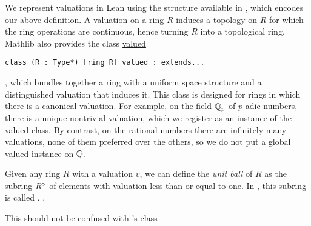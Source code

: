\documentclass[sigplan,10pt,anonymous,review]{acmart}
\begin{document}
We represent valuations in Lean using the  structure \href{https://leanprover-community.github.io/mathlib_docs/ring_theory/valuation/basic.html#valuation}{\extlink}
 available in \mathlib, which encodes our above definition. A valuation on a ring $R$ induces a topology on $R$ for which the ring operations are continuous, hence turning $R$ into a topological ring.
Mathlib also provides the class \href{https://leanprover-community.github.io/mathlib_docs/topology/algebra/valuation.html#valued}{valued}
\begin{lstlisting}
class (R : Type*) [ring R] valued : extends...
\end{lstlisting}
, which bundles together a ring with a
uniform space structure and a distinguished valuation that induces it. This class is designed for rings in which there is a canonical valuation. For example, on the field $\mathbb{Q}_p$ of $p$-adic numbers, there is a unique nontrivial valuation, which we register as an instance of the valued class. By contrast, on the rational numbers there are infinitely many valuations, none of them preferred over the others, so we do not put a global valued instance on $\mathbb{Q}$.

Given any ring $R$ with a valuation $v$, we can define the \textit{unit ball} of $R$ as the subring ${R}^\circ$ of elements with valuation less than or equal to one. In \mathlib, this subring is called  \href{https://leanprover-community.github.io/mathlib_docs/ring_theory/valuation/integers.html#valuation.integer}{\extlink}.  \href{https://leanprover-community.github.io/mathlib_docs/ring_theory/valuation/valuation_subring.html#valuation_subring}{\extlink}.


 This should not be confused with \mathlib's  \href{https://leanprover-community.github.io/mathlib_docs/ring_theory/valuation/valuation_ring.html#valuation_ring}{\extlink} class 
 
\end{document}
